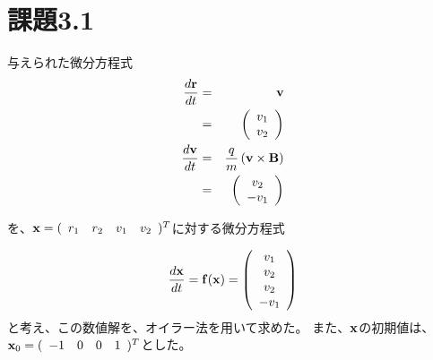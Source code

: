 \documentclass[11pt]{jsarticle}
\newcommand{\xb}{{\bf x}}
\newcommand{\fb}{{\bf f}}
\begin{document}
    \section{課題3.1}
        与えられた微分方程式
        \begin{eqnarray*}
            \frac{d{\bf r}}{dt} & = & {\bf v} \\
                                & = & \left(
                                          \begin{array}{c}
                                              v_1 \\
                                              v_2
                                          \end{array}
                                      \right) \\
            \frac{d{\bf v}}{dt} & = & \frac{q}{m}\left( {\bf v} \times {\bf B} \right) \\
                                & = & \left(
                                          \begin{array}{c}
                                              v_2 \\
                                              - v_1
                                          \end{array}
                                      \right) \\
        \end{eqnarray*}

        を、$\xb = (\begin{array}{cccc} r_1 & r_2 & v_1 & v_2 \end{array})^T$に対する微分方程式

        \begin{eqnarray}
            \frac{d\xb}{dt} = \fb(\xb) = \left(
                                             \begin{array}{c}
                                              v_1 \\
                                              v_2 \\
                                              v_2 \\
                                              - v_1 
                                             \end{array}
                                         \right)
            \label{eq1}
        \end{eqnarray}
        と考え、この数値解を、オイラー法を用いて求めた。
        また、$\xb$の初期値は、$\xb_0 = (\begin{array}{cccc} -1 & 0 & 0 & 1 \end{array})^T$とした。
\end{document}
